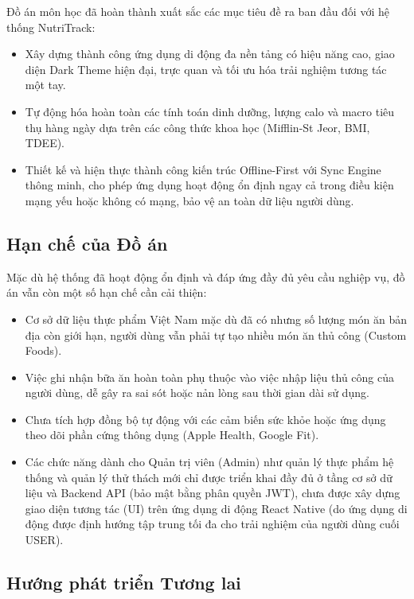 \documentclass[12pt,a4paper]{article}
\begin{document}
Đồ án môn học đã hoàn thành xuất sắc các mục tiêu đề ra ban đầu đối với hệ thống NutriTrack:
\begin{itemize}
    \item Xây dựng thành công ứng dụng di động đa nền tảng có hiệu năng cao, giao diện Dark Theme hiện đại, trực quan và tối ưu hóa trải nghiệm tương tác một tay.
    \item Tự động hóa hoàn toàn các tính toán dinh dưỡng, lượng calo và macro tiêu thụ hàng ngày dựa trên các công thức khoa học (Mifflin-St Jeor, BMI, TDEE).
    \item Thiết kế và hiện thực thành công kiến trúc Offline-First với Sync Engine thông minh, cho phép ứng dụng hoạt động ổn định ngay cả trong điều kiện mạng yếu hoặc không có mạng, bảo vệ an toàn dữ liệu người dùng.
\end{itemize}

\subsection{Hạn chế của Đồ án}

Mặc dù hệ thống đã hoạt động ổn định và đáp ứng đầy đủ yêu cầu nghiệp vụ, đồ án vẫn còn một số hạn chế cần cải thiện:
\begin{itemize}
    \item Cơ sở dữ liệu thực phẩm Việt Nam mặc dù đã có nhưng số lượng món ăn bản địa còn giới hạn, người dùng vẫn phải tự tạo nhiều món ăn thủ công (Custom Foods).
    \item Việc ghi nhận bữa ăn hoàn toàn phụ thuộc vào việc nhập liệu thủ công của người dùng, dễ gây ra sai sót hoặc nản lòng sau thời gian dài sử dụng.
    \item Chưa tích hợp đồng bộ tự động với các cảm biến sức khỏe hoặc ứng dụng theo dõi phần cứng thông dụng (Apple Health, Google Fit).
    \item Các chức năng dành cho Quản trị viên (Admin) như quản lý thực phẩm hệ thống và quản lý thử thách mới chỉ được triển khai đầy đủ ở tầng cơ sở dữ liệu và Backend API (bảo mật bằng phân quyền JWT), chưa được xây dựng giao diện tương tác (UI) trên ứng dụng di động React Native (do ứng dụng di động được định hướng tập trung tối đa cho trải nghiệm của người dùng cuối USER).
\end{itemize}

\subsection{Hướng phát triển Tương lai}
\end{document}
